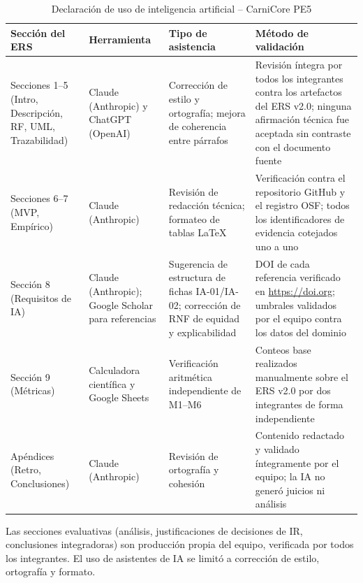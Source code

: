 \documentclass[11pt,a4paper]{article}
\begin{document}
\begin{longtable}{|p{3cm}|p{3cm}|p{4cm}|p{4cm}|}
\caption{Declaración de uso de inteligencia artificial -- CarniCore PE5}\\
\hline
\textbf{Sección del ERS} & \textbf{Herramienta} & \textbf{Tipo de asistencia} & \textbf{Método de validación} \\
\hline
Secciones 1--5 (Intro, Descripción, RF, UML, Trazabilidad) & Claude (Anthropic) y ChatGPT (OpenAI) & Corrección de estilo y ortografía; mejora de coherencia entre párrafos & Revisión íntegra por todos los integrantes contra los artefactos del ERS v2.0; ninguna afirmación técnica fue aceptada sin contraste con el documento fuente \\
\hline
Secciones 6--7 (MVP, Empírico) & Claude (Anthropic) & Revisión de redacción técnica; formateo de tablas LaTeX & Verificación contra el repositorio GitHub y el registro OSF; todos los identificadores de evidencia cotejados uno a uno \\
\hline
Sección 8 (Requisitos de IA) & Claude (Anthropic); Google Scholar para referencias & Sugerencia de estructura de fichas IA-01/IA-02; corrección de RNF de equidad y explicabilidad & DOI de cada referencia verificado en \url{https://doi.org}; umbrales validados por el equipo contra los datos del dominio \\
\hline
Sección 9 (Métricas) & Calculadora científica y Google Sheets & Verificación aritmética independiente de M1--M6 & Conteos base realizados manualmente sobre el ERS v2.0 por dos integrantes de forma independiente \\
\hline
Apéndices (Retro, Conclusiones) & Claude (Anthropic) & Revisión de ortografía y cohesión & Contenido redactado y validado íntegramente por el equipo; la IA no generó juicios ni análisis \\
\hline
\end{longtable}

Las secciones evaluativas (análisis, justificaciones de decisiones de IR, conclusiones integradoras) son producción propia del equipo, verificada por todos los integrantes. El uso de asistentes de IA se limitó a corrección de estilo, ortografía y formato.

\newpage


\end{document}
